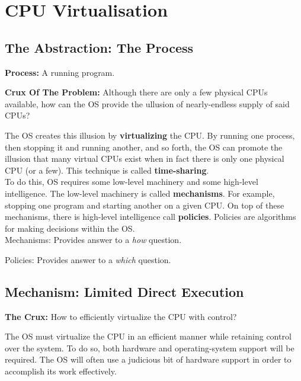 \chapter{CPU Virtualisation}

\section{The Abstraction: The Process}

\textbf{Process:} A running program.\\

\begin{tcolorbox}
    \textbf{Crux Of The Problem:} Although there are only a few physical CPUs
    available, how can the OS provide the ullusion of nearly-endless supply of 
    said CPUs?\\
\end{tcolorbox}

The OS creates this illusion by \textbf{virtualizing} the CPU. By running
one process, then stopping it and running another, and so forth, the OS can
promote the illusion that many virtual CPUs exist when in fact there is only
one physical CPU (or a few). This technique is called \textbf{time-sharing}.\\

To do this, OS requires some low-level machinery and some
high-level intelligence. The low-level machinery is called \textbf{mechanisms}.
For example, stopping one program and starting another on a given CPU. On top
of these mechanisms, there is high-level intelligence call \textbf{policies}.
Policies are algorithms for making decisions within the OS.\\

Mechanisms: Provides answer to a \textit{how} question.

Policies: Provides answer to a \textit{which} question.\\

\section{Mechanism: Limited Direct Execution}

\begin{tcolorbox}
    \textbf{The Crux:} How to efficiently virtualize the CPU with control?
\end{tcolorbox}

The OS must virtualize the CPU in an efficient manner while retaining control
over the system. To do so, both hardware and operating-system support will be
required. The OS will often use a judicious bit of hardware support in order to
accomplish its work effectively.

